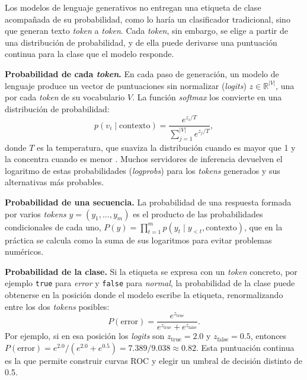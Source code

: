 Los modelos de lenguaje generativos no entregan una etiqueta de clase acompañada de su probabilidad, como lo haría un clasificador tradicional, sino que generan texto \textit{token} a \textit{token}. Cada \textit{token}, sin embargo, se elige a partir de una distribución de probabilidad, y de ella puede derivarse una puntuación continua para la clase que el modelo responde.

\textbf{Probabilidad de cada \textit{token}.} En cada paso de generación, un modelo de lenguaje produce un vector de puntuaciones sin normalizar (\textit{logits}) $z \in \mathbb{R}^{|V|}$, una por cada \textit{token} de su vocabulario $V$. La función \textit{softmax} los convierte en una distribución de probabilidad:
\begin{equation}
p(v_i \mid \text{contexto}) = \frac{e^{z_i / T}}{\sum_{j=1}^{|V|} e^{z_j / T}},
\end{equation}
donde $T$ es la temperatura, que suaviza la distribución cuando es mayor que 1 y la concentra cuando es menor \cite{yang2025_lightweight}. Muchos servidores de inferencia devuelven el logaritmo de estas probabilidades (\textit{logprobs}) para los \textit{tokens} generados y sus alternativas más probables.

\textbf{Probabilidad de una secuencia.} La probabilidad de una respuesta formada por varios \textit{tokens} $y = (y_1, \ldots, y_m)$ es el producto de las probabilidades condicionales de cada uno, $P(y) = \prod_{t=1}^{m} p(y_t \mid y_{<t}, \text{contexto})$, que en la práctica se calcula como la suma de sus logaritmos para evitar problemas numéricos.

\textbf{Probabilidad de la clase.} Si la etiqueta se expresa con un \textit{token} concreto, por ejemplo \texttt{true} para \emph{error} y \texttt{false} para \emph{normal}, la probabilidad de la clase puede obtenerse en la posición donde el modelo escribe la etiqueta, renormalizando entre los dos \textit{tokens} posibles:
\begin{equation}
P(\text{error}) = \frac{e^{z_{\text{true}}}}{e^{z_{\text{true}}} + e^{z_{\text{false}}}}.
\end{equation}
Por ejemplo, si en esa posición los \textit{logits} son $z_{\text{true}} = 2.0$ y $z_{\text{false}} = 0.5$, entonces $P(\text{error}) = e^{2.0}/(e^{2.0} + e^{0.5}) = 7.389/9.038 \approx 0.82$. Esta puntuación continua es la que permite construir curvas ROC y elegir un umbral de decisión distinto de 0.5.

